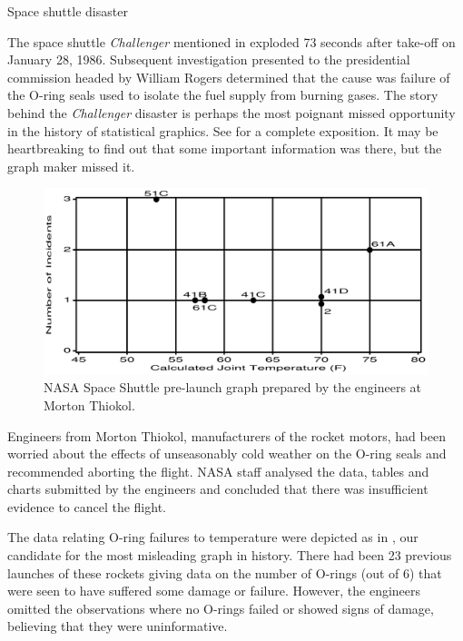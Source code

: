 \documentclass[10pt,krantz2]{krantz}\usepackage[]{graphicx}\usepackage[]{color}
\begin{document}
\begin{Example}[nasa]{Space shuttle disaster}

The space shuttle \emph{Challenger} mentioned in 
exploded 73 seconds after take-off on
January 28, 1986.
Subsequent investigation presented to the presidential commission
headed by William Rogers
determined that the cause was failure of the O-ring
seals used to isolate the fuel supply from burning gases.
The story behind the \emph{Challenger} disaster is perhaps the most poignant
missed opportunity in the history of statistical graphics.
See \citet{Tufte:97} for a complete exposition.
It may be heartbreaking to find out that some important information
was there, but the graph maker missed it.

\begin{figure}[htb]
  \centering
  \includegraphics[width=\textwidth,clip]{ch01/fig/nasa0}
  \caption{NASA Space Shuttle pre-launch graph prepared by the engineers at Morton Thiokol.
  }\label{fig:nasa0}
\end{figure}

Engineers from Morton Thiokol, manufacturers of the rocket motors,
had been worried about the effects of unseasonably cold weather
on the O-ring seals and recommended aborting the flight.
NASA staff analysed the data, tables and charts submitted by
the engineers and concluded that there was insufficient evidence
to cancel the flight.

The data relating O-ring failures to temperature were depicted as in
, our candidate for the most misleading graph in history.
There had been 23 previous launches of these rockets giving data on
the number of O-rings (out of 6) that were seen to have suffered
some damage or failure. However, the engineers omitted the observations
where no O-rings failed or showed signs of damage, believing that they were uninformative.


\end{Example}
\end{document}
